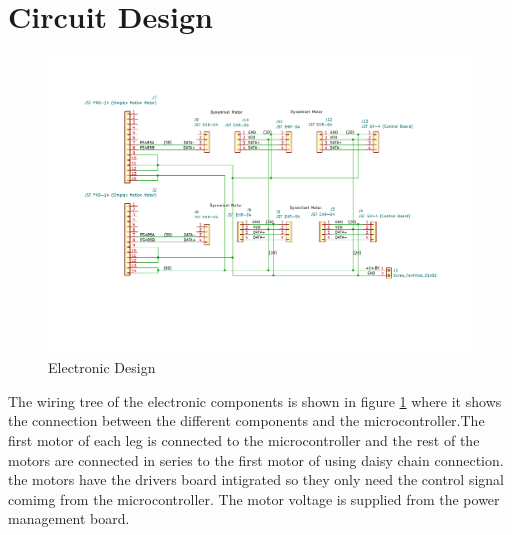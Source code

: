 \section{Circuit Design}
\begin{figure}[h]
	\centering
	\includegraphics[width=1\linewidth]{Legged_TWIPR_Wiring_Tree}
	\caption[ brakets for delectronic design second test ]{Electronic Design}
	\label{fig:electronicdesign}
\end{figure}
The wiring tree of the electronic components is shown in figure \ref{fig:electronicdesign} where it shows the connection between the different components and the microcontroller.The first motor of each leg is connected to the microcontroller and the rest of the motors are connected in series to the first motor of using daisy chain connection. the motors have the drivers board intigrated so they only need the control signal comimg from the microcontroller. The motor voltage is supplied from the power management board.
